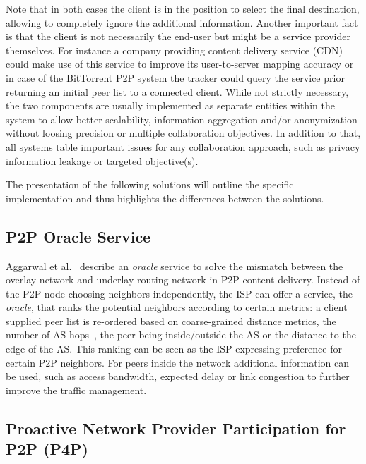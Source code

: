 Note that in both cases the client is in the position to select the final
destination, allowing to completely ignore the additional information. Another
important fact is that the client is not necessarily the end-user but might be
a service provider themselves. For instance a company providing content
delivery service (CDN) could make use of this service to improve its
user-to-server mapping accuracy or in case of the BitTorrent P2P system the
tracker could query the service prior returning an initial peer list to a
connected client.  While not strictly necessary, the two components are
usually implemented as separate entities within the system to allow better
scalability, information aggregation and/or anonymization without loosing
precision or multiple collaboration objectives. In addition to that, all
systems table important issues for any collaboration approach, such as privacy
information leakage or targeted objective(s).

The presentation of the following solutions will outline the specific
implementation and thus highlights the differences between the solutions.

\subsection{P2P Oracle Service}\label{sec:p2p-collaboration}

Aggarwal et al.~\cite{afs-cispp2pcip-ccr07} describe an \emph{oracle} service to
solve the mismatch between the overlay network and underlay routing network in
P2P content delivery. Instead of the P2P node choosing neighbors independently,
the ISP can offer a service, the \emph{oracle}, that ranks the potential
neighbors according to certain metrics: a client supplied peer list is
re-ordered based on coarse-grained distance metrics, \eg the number of AS
hops~\cite{routing-book-00}, the peer being inside/outside the AS or the
distance to the edge of the AS. This ranking can be seen as the ISP expressing
preference for certain P2P neighbors.  For peers inside the network additional
information can be used, such as access bandwidth, expected delay or link
congestion to further improve the traffic management.


\subsection{Proactive Network Provider Participation for P2P (P4P)}\label{sec:P4P}

